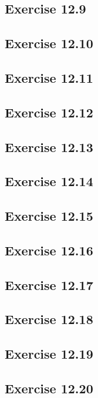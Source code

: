 \documentclass[a4paper,12pt]{article}
\begin{document}
\subsection*{Exercise 12.9}
\subsection*{Exercise 12.10}
\subsection*{Exercise 12.11}
\subsection*{Exercise 12.12}
\subsection*{Exercise 12.13}
\subsection*{Exercise 12.14}
\subsection*{Exercise 12.15}
\subsection*{Exercise 12.16}
\subsection*{Exercise 12.17}
\subsection*{Exercise 12.18}
\subsection*{Exercise 12.19}
\subsection*{Exercise 12.20}
\end{document}
